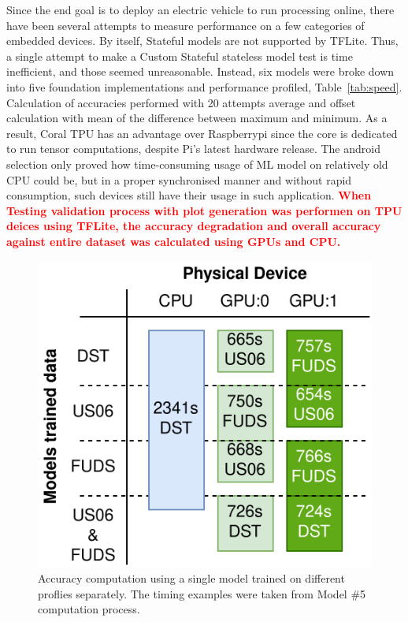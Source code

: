 %
%
Since the end goal is to deploy an electric vehicle to run processing online, there have been several attempts to measure performance on a few categories of embedded devices.
By itself, Stateful models are not supported by TFLite.
Thus, a single attempt to make a Custom Stateful stateless model test is time inefficient, and those seemed unreasonable.
Instead, six models were broke down into five foundation implementations and performance profiled, \mbox{Table~\ref{tab:speed}}.
Calculation of accuracies performed with 20 attempts average and offset calculation with mean of the difference between maximum and minimum.
As a result, Coral TPU has an advantage over Raspberrypi since the core is dedicated to run tensor computations, despite Pi's latest hardware release.
The android selection only proved how time-consuming usage of ML model on relatively old CPU could be, but in a proper synchronised manner and without rapid consumption, such devices still have their usage in such application.
\textcolor{red}{\textbf{When Testing validation process  with plot generation was performen on TPU deices using TFLite, the accuracy degradation and overall accuracy against entire dataset was calculated using GPUs and CPU.}}
\begin{figure}[ht]
    \centering
    \includegraphics[width=\columnwidth]{II_Body/images/Accuracy_Compute.png}
    \caption{Accuracy computation using a single model trained on different proflies separately. The timing examples were taken from Model \#5 computation process.}
    \label{fig:device_compute}
\end{figure}
